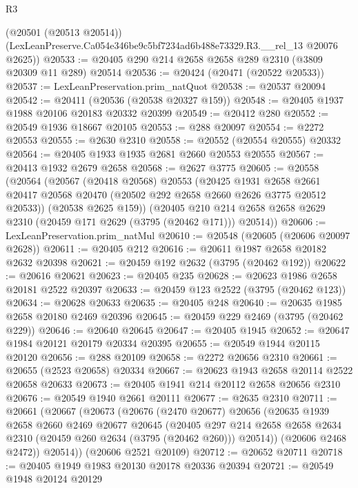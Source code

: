\begin{lexlean}{R3}
\begin{coremodule}
      (@20501 (@20513 @20514))
      (LexLeanPreserve.Ca054e346be9c5bf7234ad6b488e73329.R3.__rel_13 @20076 @2625))
@20533 := @20405 @290 @214 @2658 @2658 @289 @2310 (@3809 @20309 @11 @289) @20514
@20536 := @20424 (@20471 (@20522 @20533))
@20537 := LexLeanPreservation.prim_natQuot
@20538 := @20537 @20094
@20542 := @20411 (@20536 (@20538 @20327 @159))
@20548 := @20405 @1937 @1988 @20106 @20183 @20332 @20399
@20549 := @20412 @280
@20552 := @20549 @1936 @18667 @20105
@20553 := @288 @20097
@20554 := @2272 @20553
@20555 := @2630 @2310
@20558 := @20552 (@20554 @20555) @20332
@20564 := @20405 @1933 @1935 @2681 @2660 @20553 @20555
@20567 := @20413 @1932 @2679 @2658
@20568 := @2627 @3775
@20605 := @20558
    (@20564
      (@20567
        (@20418 @20568)
        @20553
        (@20425
          @1931
          @2658
          @2661
          @20417
          @20568
          @20470
          (@20502 @292 @2658 @2660 @2626 @3775 @20512 @20533))
        (@20538 @2625 @159))
      (@20405 @210 @214 @2658 @2658 @2629 @2310 (@20459 @171 @2629 (@3795 (@20462 @171))) @20514))
@20606 := LexLeanPreservation.prim_natMul
@20610 := @20548 (@20605 (@20606 @20097 @2628))
@20611 := @20405 @212
@20616 := @20611 @1987 @2658 @20182 @2632 @20398
@20621 := @20459 @192 @2632 (@3795 (@20462 @192))
@20622 := @20616 @20621
@20623 := @20405 @235
@20628 := @20623 @1986 @2658 @20181 @2522 @20397
@20633 := @20459 @123 @2522 (@3795 (@20462 @123))
@20634 := @20628 @20633
@20635 := @20405 @248
@20640 := @20635 @1985 @2658 @20180 @2469 @20396
@20645 := @20459 @229 @2469 (@3795 (@20462 @229))
@20646 := @20640 @20645
@20647 := @20405 @1945
@20652 := @20647 @1984 @20121 @20179 @20334 @20395
@20655 := @20549 @1944 @20115 @20120
@20656 := @288 @20109
@20658 := @2272 @20656 @2310
@20661 := @20655 (@2523 @20658) @20334
@20667 := @20623 @1943 @2658 @20114 @2522 @20658 @20633
@20673 := @20405 @1941 @214 @20112 @2658 @20656 @2310
@20676 := @20549 @1940 @2661 @20111
@20677 := @2635 @2310
@20711 := @20661
    (@20667
      (@20673
        (@20676
          (@2470 @20677)
          @20656
          (@20635
            @1939
            @2658
            @2660
            @2469
            @20677
            @20645
            (@20405
              @297
              @214
              @2658
              @2658
              @2634
              @2310
              (@20459 @260 @2634 (@3795 (@20462 @260)))
              @20514))
          (@20606 @2468 @2472))
        @20514))
    (@20606 @2521 @20109)
@20712 := @20652 @20711
@20718 := @20405 @1949 @1983 @20130 @20178 @20336 @20394
@20721 := @20549 @1948 @20124 @20129

\end{coremodule}
\end{lexlean}
